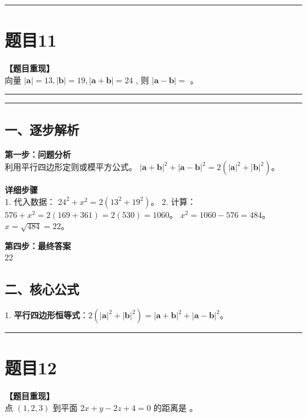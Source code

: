 \documentclass[12pt, a4paper]{ctexart}
\newcommand{\TopSeparator}{
    \par\noindent\rule{\textwidth}{1.5pt}\vspace{0.5em} %
}
\newcommand{\AnalysisSeparator}{
    \par\noindent\rule{\textwidth}{0.5pt}\vspace{0.2em}\hrule\vspace{0.5em} %
}
\newenvironment{RedAnalysis}{
    \par
    \color{red} %
}{
    \par
    \color{black} %
}
\begin{document}
\vspace{2em}

\TopSeparator
\section*{题目11}

\textbf{【题目重现】} \\
向量 $ \left|\mathbf{a}\right|=13,\left|\mathbf{b}\right|=19,\left|\mathbf{a}+\mathbf{b}\right|=24 $ , 则 $ \left|\mathbf{a}-\mathbf{b}\right|= $ \underline{\hspace{2cm}}。

\AnalysisSeparator

\begin{RedAnalysis}

\subsection*{一、逐步解析}

\textbf{第一步：问题分析} \\
利用平行四边形定则或模平方公式。
$|\mathbf{a}+\mathbf{b}|^2 + |\mathbf{a}-\mathbf{b}|^2 = 2(|\mathbf{a}|^2 + |\mathbf{b}|^2)$。

\textbf{详细步骤} \\
1. 代入数据：
   $24^2 + x^2 = 2(13^2 + 19^2)$。
2. 计算：
   $576 + x^2 = 2(169 + 361) = 2(530) = 1060$。
   $x^2 = 1060 - 576 = 484$。
   $x = \sqrt{484} = 22$。

\textbf{第四步：最终答案} \\
22

\subsection*{二、核心公式}
1. \textbf{平行四边形恒等式}：$2(|\mathbf{a}|^2 + |\mathbf{b}|^2) = |\mathbf{a}+\mathbf{b}|^2 + |\mathbf{a}-\mathbf{b}|^2$。

\end{RedAnalysis}

\vspace{2em}

\TopSeparator
\section*{题目12}

\textbf{【题目重现】} \\
点 $ (1,2,3) $ 到平面 $ 2x + y - 2z + 4 = 0 $ 的距离是 \underline{\hspace{2cm}}。
\end{document}
